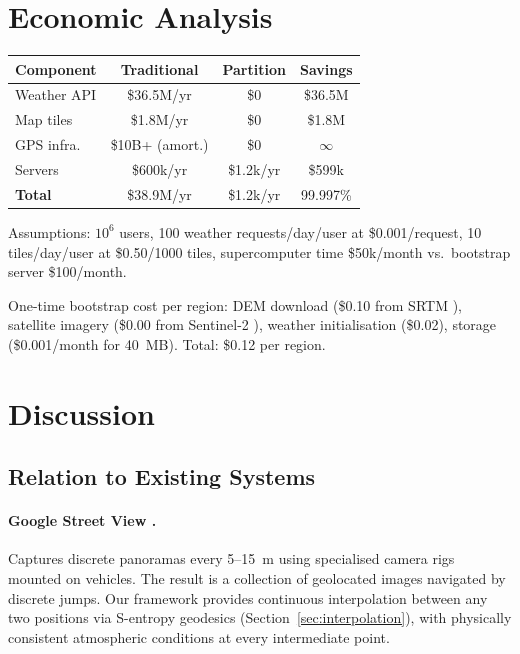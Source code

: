 \documentclass[10pt,twocolumn]{article}
\theoremstyle{definition}
\theoremstyle{remark}
\begin{document}
\section{Economic Analysis}\label{sec:economic}

\begin{center}
\small
\begin{tabular}{@{}lccc@{}}
\toprule
\textbf{Component} & \textbf{Traditional} & \textbf{Partition}
  & \textbf{Savings}\\
\midrule
Weather API & \$36.5M/yr & \$0 & \$36.5M\\
Map tiles & \$1.8M/yr & \$0 & \$1.8M\\
GPS infra. & \$10B+ (amort.) & \$0 & $\infty$\\
Servers & \$600k/yr & \$1.2k/yr & \$599k\\
\midrule
\textbf{Total} & \$38.9M/yr & \$1.2k/yr & 99.997\%\\
\bottomrule
\end{tabular}
\end{center}

Assumptions: $10^6$ users, 100 weather requests/day/user at
\$0.001/request, 10 tiles/day/user at \$0.50/1000 tiles,
supercomputer time \$50k/month vs.\ bootstrap server
\$100/month.

One-time bootstrap cost per region: DEM download (\$0.10 from
SRTM \citep{Farr2007}), satellite imagery (\$0.00 from
Sentinel-2 \citep{Drusch2012}), weather initialisation
(\$0.02), storage (\$0.001/month for 40~MB).  Total:
\$0.12 per region.

\section{Discussion}\label{sec:discussion}

\subsection{Relation to Existing Systems}\label{sec:relation}

\paragraph{Google Street View \citep{Anguelov2010}.}
Captures discrete panoramas every 5--15~m using specialised
camera rigs mounted on vehicles.  The result is a collection
of geolocated images navigated by discrete jumps.  Our
framework provides continuous interpolation between any two
positions via S-entropy geodesics
(Section~\ref{sec:interpolation}), with physically consistent
atmospheric conditions at every intermediate point.
\end{document}
